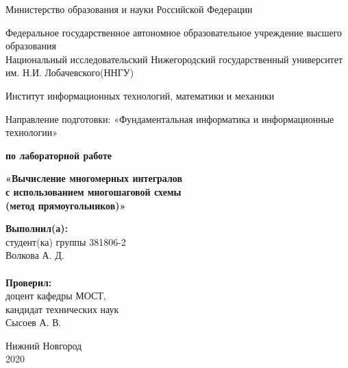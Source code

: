 \documentclass{report}
\begin{document}
\begin{titlepage}
\begin{center}
Министерство образования и науки Российской Федерации
\end{center}
\begin{center}
Федеральное государственное автономное образовательное учреждение высшего образования \\
Национальный исследовательский Нижегородский государственный университет им. Н.И. Лобачевского(ННГУ)
\end{center}
\begin{center}
Институт информационных технологий, математики и механики
\end{center}
\begin{center}
Направление подготовки: «Фундаментальная информатика и информационные технологии»
\end{center}

\vspace{2em}

\begin{center}
\textbf{ по лабораторной работе} 
\end{center}
\begin{center}
\textbf{\Large«Вычисление многомерных интегралов \\
с использованием многошаговой схемы \\
(метод прямоугольников)»} \\
\end{center}

\vspace{4em}

\newbox{\lbox}
\newlength{\maxl}
\setlength{\maxl}{\wd\lbox}
\hfill\parbox{7cm}{
\textbf{Выполнил(а):} \\ студент(ка) группы 381806-2 \\ Волкова А. Д.\\
\\
\textbf{Проверил:}\\ доцент кафедры МОСТ, \\ кандидат технических наук \\ Сысоев А. В.\\
}
\vspace{\fill}

\begin{center} Нижний Новгород \\ 2020 \end{center}

\end{titlepage}
\end{document}
